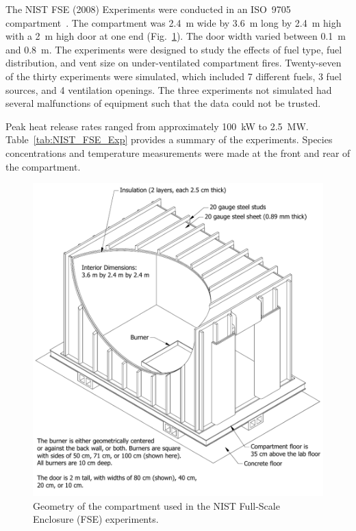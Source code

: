 The NIST FSE (2008) Experiments were conducted in an ISO~9705 compartment~\cite{Lock:1}. The compartment was 2.4~m wide by 3.6~m long by 2.4~m high with a 2~m high door at one end (Fig.~\ref{NIST_FSE_2008_Drawing}). The door width varied between 0.1~m and 0.8~m. The experiments were designed to study the effects of fuel type, fuel distribution, and vent size on under-ventilated compartment fires. Twenty-seven of the thirty experiments were simulated, which included 7 different fuels, 3 fuel sources, and 4 ventilation openings. The three experiments not simulated had several malfunctions of equipment such that the data could not be trusted.

Peak heat release rates ranged from approximately 100~kW to 2.5~MW. Table~\ref{tab:NIST_FSE_Exp} provides a summary of the experiments. Species concentrations and temperature measurements were made at the front and rear of the compartment.



\begin{figure}[!ht]
\includegraphics[width=\textwidth]{FIGURES/NIST_FSE_2008/NIST_FSE_2008_Drawing}
\caption[Geometry of the compartment used in the NIST Full-Scale Enclosure experiments]{Geometry of the compartment used in the NIST Full-Scale Enclosure (FSE) experiments.}
\label{NIST_FSE_2008_Drawing}
\end{figure}

